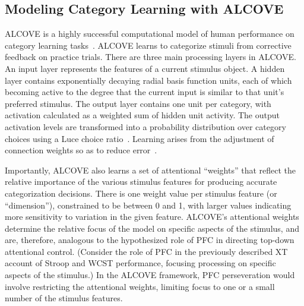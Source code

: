
\subsection{Modeling Category Learning with ALCOVE}
ALCOVE is a highly successful computational model of human performance on category learning tasks~\cite{KruschkeJK:1992:ALCOVE}. ALCOVE learns to categorize stimuli from corrective feedback on practice trials. There are three main processing layers in ALCOVE. An input layer represents the features of a current stimulus object. A hidden layer contains exponentially decaying radial basis function units, each of which becoming active to the degree that the current input is similar to that unit's preferred stimulus. The output layer contains one unit per category, with activation calculated as a weighted sum of hidden unit activity. The output activation levels are transformed into a probability distribution over category choices using a Luce choice ratio~\cite{LuceRD:1963:Ratio}. Learning arises from the adjustment of connection weights so as to reduce error~\cite{KruschkeJK:1992:ALCOVE}.

Importantly, ALCOVE also learns a set of attentional ``weights'' that reflect the relative importance of the various stimulus features for producing accurate categorization decisions. There is one weight value per stimulus feature (or ``dimension''), constrained to be between 0 and 1, with larger values indicating more sensitivity to variation in the given feature. ALCOVE's attentional weights determine the relative focus of the model on specific aspects of the stimulus, and are, therefore, analogous to the hypothesized role of PFC in directing top-down attentional control. (Consider the role of PFC in the previously described XT account of Stroop and WCST performance, focusing processing on specific aspects of the stimulus.) In the ALCOVE framework, PFC perseveration would involve restricting the attentional weights, limiting focus to one or a small number of the stimulus features.  

